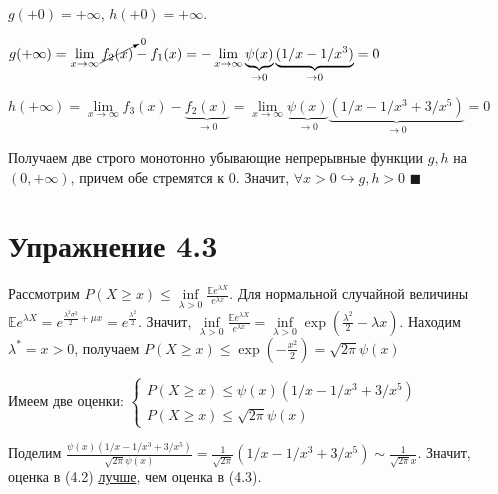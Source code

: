 \documentclass[a4paper]{article}
\begin{document}
$g(+0)=+\infty$, $h(+0)=+\infty$.

$g(+\infty)=\lim\limits_{x\to\infty}\cancelto{0}{f_2(x)}-f_1(x)=-\lim\limits_{x\to\infty}\underbrace{\psi(x)}_{\to 0}\underbrace{(1/x-1/x^3)}_{\to 0}=0$

$h(+\infty)=\lim\limits_{x\to\infty}f_3(x)-\underbrace{f_2(x)}_{\to 0}=\lim\limits_{x\to\infty}\underbrace{\psi(x)}_{\to 0}\underbrace{(1/x-1/x^3+3/x^5)}_{\to 0}=0$

Получаем две строго монотонно убывающие непрерывные функции $g,h$ на $(0,+\infty)$, причем обе стремятся к 0. Значит, $\forall x>0\hookrightarrow g,h>0$ $\blacksquare$

\section*{Упражнение 4.3}
Рассмотрим $P(X\geqslant x)\leqslant\inf\limits_{\lambda > 0}\frac{\mathbb{E}e^{\lambda X}}{e^{\lambda x}}$. Для нормальной случайной величины $\mathbb{E}e^{\lambda X}=e^{\frac{\lambda^2\sigma^2}{2}+\mu x}=e^{\frac{\lambda^2}{2}}$. Значит, $\inf\limits_{\lambda >0}\frac{\mathbb{E}e^{\lambda X}}{e^{\lambda x}}=\inf\limits_{\lambda >0}\exp(\frac{\lambda^2}{2}-\lambda x)$. Находим $\lambda^*=x>0$, получаем $P(X\geqslant x)\leqslant \exp(-\frac{x^2}{2})=\sqrt{2\pi}\psi(x)$

Имеем две оценки:
$\begin{cases}
P(X\geqslant x)\leqslant \psi(x)(1/x-1/x^3+3/x^5)\\
P(X\geqslant x)\leqslant \sqrt{2\pi}\psi(x)
\end{cases}$

Поделим $\frac{\psi(x)(1/x-1/x^3+3/x^5)}{\sqrt{2\pi}\psi(x)}=\frac{1}{\sqrt{2\pi}}(1/x-1/x^3+3/x^5)\sim\frac{1}{\sqrt{2\pi}x}$. Значит, оценка в (4.2) \underline{лучше}, чем оценка в (4.3).
\end{document}
